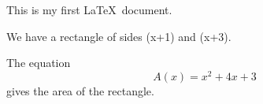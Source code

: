 \documentclass{article}
\begin{document}
This is my first \LaTeX\ document.

We have a rectangle of sides (x+1) and (x+3).

The equation $$ A(x) = x^2 + 4x + 3 $$ gives the area of the rectangle.
\end{document}
